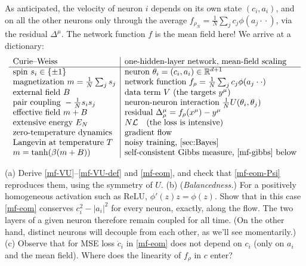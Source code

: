 \documentclass[11pt]{article}
\newcommand{\R}{\mathbb{R}}
\newcommand{\CL}{{\mathcal L}}
\begin{document}
As anticipated, the velocity of neuron $i$ depends on its own state $(c_i,a_i)$, and on all the other neurons only through the average $f_{\rho_N} = \frac{1}{N}\sum_j c_j\phi(a_j\cdot{}\cdot)$, via the residual $\Delta^\mu$. %
The network function $f$ is the mean field here!  We arrive at a dictionary:
%
\begin{equation} \label{mf-dictionary}
\begin{array}{l|l}
    \text{Curie--Weiss} & \text{one-hidden-layer network, mean-field scaling} \\\hline
    \text{spin } s_i\in\{\pm1\} & \text{neuron } \theta_i=(c_i,a_i)\in\R^{d+1} \\
    \text{magnetization } m=\frac{1}{N}\sum_j s_j & \text{network function } f_{\rho}=\frac{1}{N}\sum_j c_j\phi(a_j\cdot{}\cdot) \\
    \text{external field } B & \text{data term } V \text{ (the targets } y^\mu\text{)} \\
    \text{pair coupling } -\tfrac{1}{N} s_is_j & \text{neuron-neuron interaction } \tfrac{1}{N} U(\theta_i,\theta_j) \\
    \text{effective field } m+B & \text{residual } \Delta^\mu_\rho = f_\rho(x^\mu)-y^\mu \\
    \text{extensive energy } E_N & N\CL \quad(\text{the loss is intensive}) \\
    \text{zero-temperature dynamics} & \text{gradient flow} \\
    \text{Langevin at temperature } T & \text{noisy training, \cref{sec:Bayes}} \\
    m = \tanh(\beta(m+B)) & \text{self-consistent Gibbs measure, \cref{mf-gibbs} below}
\end{array}
\end{equation}
%

\begin{exercise}
\label{ex:mf-eom}
(a) Derive \eqref{mf-VU}--\eqref{mf-VU-def} and \eqref{mf-eom}, and check that \eqref{mf-eom-Psi} reproduces them, using the symmetry of $U$.
(b) (\emph{Balancedness.}) For a positively homogeneous activation such as ReLU, $\phi'(z)z = \phi(z)$. Show that in this case \eqref{mf-eom} conserves $c_i^2 - |a_i|^2$ for every neuron, exactly, along the flow. The two layers of a given neuron therefore remain coupled for all time. (On the other hand, distinct neurons will decouple from each other, as we'll see momentarily.)
(c) Observe that for MSE loss $\dot c_i$ in \eqref{mf-eom} does not depend on $c_i$ (only on $a_i$ and the mean field). Where does the linearity of $f_\rho$ in $c$ enter?
\end{exercise}
\end{document}
